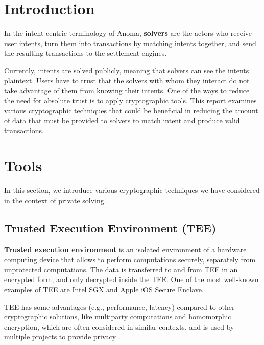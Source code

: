 \documentclass[
    9pt,            %
    report,        %
    affiltop,       %
]{art}
\begin{document}
\maketitle

\section{Introduction}

In the intent-centric terminology of Anoma, \textbf{solvers} are the actors who receive user intents, turn them into transactions by matching intents together, and send the resulting transactions to the settlement engines. 

Currently, intents are solved publicly, meaning that solvers can see the intents plaintext. Users have to trust that the solvers with whom they interact do not take advantage of them from knowing their intents. One of the ways to reduce the need for absolute trust is to apply cryptographic tools. This report examines various cryptographic techniques that could be beneficial in reducing the amount of data that must be provided to solvers to match intent and produce valid transactions.

\section{Tools}

In this section, we introduce various cryptographic techniques we have considered in the context of private solving. 

\subsection{Trusted Execution Environment (TEE)}

\textbf{Trusted execution environment} is an isolated environment of a hardware computing device that allows to perform computations securely, separately from unprotected computations. The data is transferred to and from TEE in an encrypted form, and only decrypted inside the TEE. One of the most well-known examples of TEE are Intel SGX and Apple iOS Secure Enclave. 

TEE has some advantages (e.g., performance, latency) compared to other cryptographic solutions, like multiparty computations and homomorphic encryption, which are often considered in similar contexts, and is used by multiple projects to provide privacy \cite{flash} \cite{secret}.
\end{document}
